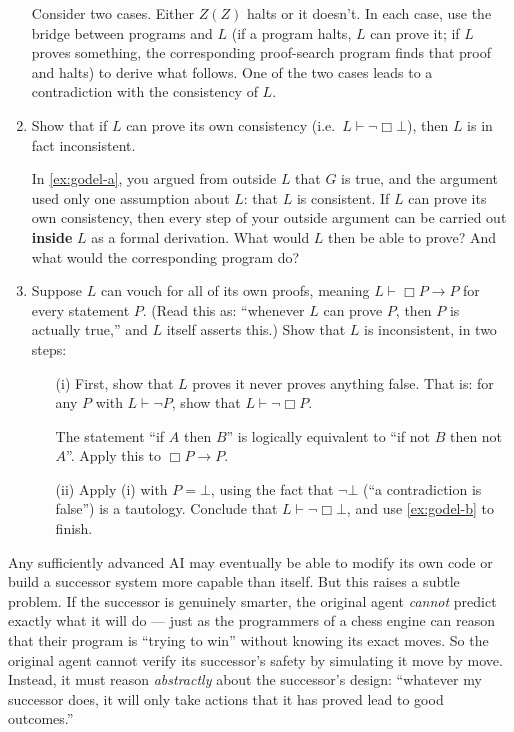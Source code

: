 \documentclass[11pt]{article}
\begin{document}
\begin{exercise}
\begin{enumerate}
\begin{hint}
Consider two cases. Either $Z(Z)$ halts or it doesn't. In each case, use
the bridge between programs and $L$ (if a program halts, $L$ can prove it; if $L$
proves something, the corresponding proof-search program finds that proof and halts)
to derive what follows. One of the two cases leads to a contradiction with the
consistency of $L$.
\end{hint}

\item \label{ex:godel-b} Show that if $L$ can prove its own consistency (i.e.\
$L \vdash \neg\Box\bot$), then $L$ is in fact inconsistent.

\begin{hint}

In \cref{ex:godel-a}, you argued from outside $L$ that $G$ is true, and the
argument used only one assumption about $L$: that $L$ is consistent. If $L$ can prove
its own consistency, then every step of your outside argument can be carried out
\textbf{inside} $L$ as a formal derivation. What would $L$ then be able to prove?
And what would the corresponding program do?
\end{hint}

\item \label{ex:godel-c} Suppose $L$ can vouch for all of its own proofs, meaning
$L \vdash \Box P \to P$ for every statement $P$. (Read this as: ``whenever $L$ can
prove $P$, then $P$ is actually true,'' and $L$ itself asserts this.) Show that $L$ is
inconsistent, in two steps:

\begin{itemize}
  \item[(i)] First, show that $L$ proves it never proves anything false. That is: for
    any $P$ with $L \vdash \neg P$, show that $L \vdash \neg\Box P$.
    \begin{hint}
    The statement ``if $A$ then $B$'' is logically equivalent to ``if not
    $B$ then not $A$''. Apply this to $\Box P \to P$.
    \end{hint}
  \item[(ii)] Apply (i) with $P = \bot$, using the fact that $\neg\bot$ (``a
    contradiction is false'') is a tautology. Conclude that
    $L \vdash \neg\Box\bot$, and use \cref{ex:godel-b} to finish.
\end{itemize}
\end{enumerate}

\begin{remark}[Self-trust, tiling agents, and the Löbian obstacle]
Any sufficiently advanced AI may eventually be able to modify its own code or build a
successor system more capable than itself. But this raises a subtle problem. If the
successor is genuinely smarter, the original agent \emph{cannot} predict exactly what
it will do --- just as the programmers of a chess engine can reason that their program
is ``trying to win'' without knowing its exact moves. So the original agent cannot
verify its successor's safety by simulating it move by move. Instead, it must reason
\emph{abstractly} about the successor's design: ``whatever my successor does, it will
only take actions that it has proved lead to good outcomes.''


\end{remark}
\end{exercise}
\end{document}
